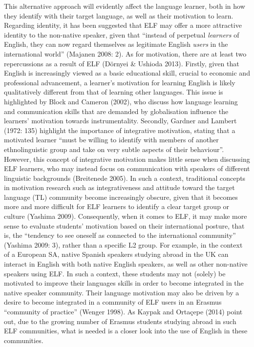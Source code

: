 \documentclass[12pt]{article}
\newenvironment{styleStandard}{\setlength\leftskip{0cm}\setlength\rightskip{0cm plus 1fil}\setlength\parindent{0cm}\setlength\parfillskip{0pt plus 1fil}\setlength\parskip{0in plus 1pt}\writerlistparindent\writerlistleftskip\leavevmode\normalfont\normalsize\writerlistlabel\ignorespaces}{\unskip\vspace{0.111in plus 0.0111in}\par}
\newcommand\writerlistleftskip{}
\newcommand\writerlistparindent{}
\newcommand\writerlistlabel{}
\begin{document}
\begin{styleStandard}
This alternative approach will evidently affect the language learner, both in how they identify with their target language, as well as their motivation to learn. Regarding identity, it has been suggested that ELF may offer a more attractive identity to the non-native speaker, given that “instead of perpetual \textit{learners }of English, they can now regard themselves as legitimate English \textit{users }in the international world” (Majanen 2008: 2). As for motivation, there are at least two repercussions as a result of ELF (Dörnyei \& Ushioda 2013). Firstly, given that English is increasingly viewed as a basic educational skill, crucial to economic and professional advancement, a learner’s motivation for learning English is likely qualitatively different from that of learning other languages. This issue is highlighted by Block and Cameron (2002), who discuss how language learning and communication skills that are demanded by globalisation influence the learners’ motivation towards instrumentality. Secondly, Gardner and Lambert (1972: 135) highlight the importance of integrative motivation, stating that a motivated learner “must be willing to identify with members of another ethnolinguistic group and take on very subtle aspects of their behaviour”. However, this concept of integrative motivation makes little sense when discussing ELF learners, who may instead focus on communication with speakers of different linguistic backgrounds (Breitenede 2005). In such a context, traditional concepts in motivation research such as integrativeness and attitude toward the target language (TL) community become increasingly obscure, given that it becomes more and more difficult for ELF learners to identify a clear target group or culture (Yashima 2009). Consequently, when it comes to ELF, it may make more sense to evaluate students’ motivation based on their international posture, that is, the “tendency to see oneself as connected to the international community” (Yashima 2009: 3), rather than a specific L2 group. For example, in the context of a European SA, native Spanish speakers studying abroad in the UK can interact in English with both native English speakers, as well as other non-native speakers using ELF. In such a context, these students may not (solely) be motivated to improve their languages skills in order to become integrated in the native speaker community. Their language motivation may also be driven by a desire to become integrated in a community of ELF users in an Erasmus “community of practice” (Wenger 1998). As Kaypak and Ortaçepe (2014) point out, due to the growing number of Erasmus students studying abroad in such ELF communities, what is needed is a closer look into the use of English in these communities.
\end{styleStandard}
\end{document}
